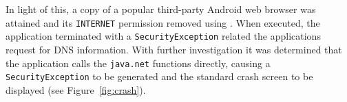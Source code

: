 In light of this, a copy of a popular third-party Android web browser was attained and its \texttt{INTERNET} permission removed using \toolname. When executed, the application terminated with a \texttt{SecurityException} related the applications request for DNS information. With further investigation it was determined that the application calls the \texttt{java.net} functions directly, causing a \texttt{SecurityException} to be generated and the standard crash screen to be displayed (see Figure~\ref{fig:crash}).


\begin{figure}[h!]
\hfill
{}

\end{figure}
